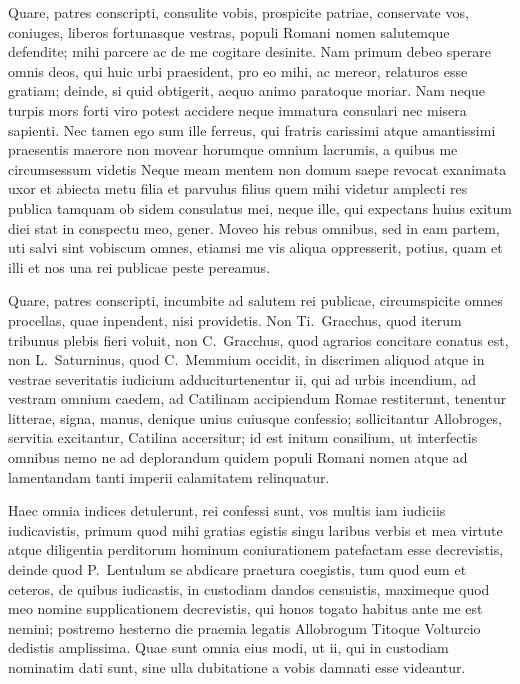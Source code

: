 \documentclass{elsart}
\begin{document}
Quare, patres conscripti, consulite vobis, prospicite patriae,
conservate vos, coniuges, liberos fortunasque vestras, populi Romani
nomen salutemque defendite; mihi parcere ac de me cogitare desinite. Nam
primum debeo sperare omnis deos, qui huic urbi praesident, pro eo mihi,
ac mereor, relaturos esse gratiam; deinde, si quid obtigerit, aequo
animo paratoque moriar. Nam neque turpis mors forti viro potest accidere
neque immatura consulari nec misera sapienti. Nec tamen ego sum ille
ferreus, qui fratris carissimi atque amantissimi praesentis maerore non
movear horumque omnium lacrumis, a quibus me circumsessum videtis Neque
meam mentem non domum saepe revocat exanimata uxor et abiecta metu filia
et parvulus filius quem mihi videtur amplecti res publica tamquam ob
sidem consulatus mei, neque ille, qui expectans huius exitum diei stat
in conspectu meo, gener. Moveo his rebus omnibus, sed in eam partem, uti
salvi sint vobiscum omnes, etiamsi me vis aliqua oppresserit, potius,
quam et illi et nos una rei publicae peste pereamus. \par Quare, patres
conscripti, incumbite ad salutem rei publicae, circumspicite omnes
procellas, quae inpendent, nisi providetis. Non Ti.~Gracchus, quod
iterum tribunus plebis fieri voluit, non C.~Gracchus, quod agrarios
concitare conatus est, non L.~Saturninus, quod C.~Memmium occidit, in
discrimen aliquod atque in vestrae severitatis iudicium
adduciturtenentur ii, qui ad urbis incendium, ad vestram omnium caedem,
ad Catilinam accipiendum Romae restiterunt, tenentur litterae, signa,
manus, denique unius cuiusque confessio; sollicitantur Allobroges,
servitia excitantur, Catilina accersitur; id est initum consilium, ut
interfectis omnibus nemo ne ad deplorandum quidem populi Romani nomen
atque ad lamentandam tanti imperii calamitatem relinquatur. \par Haec omnia
indices detulerunt, rei confessi sunt, vos multis iam iudiciis
iudicavistis, primum quod mihi gratias egistis singu laribus verbis et
mea virtute atque diligentia perditorum hominum coniurationem patefactam
esse decrevistis, deinde quod P.~Lentulum se abdicare praetura
coegistis, tum quod eum et ceteros, de quibus iudicastis, in custodiam
dandos censuistis, maximeque quod meo nomine supplicationem decrevistis,
qui honos togato habitus ante me est nemini; postremo hesterno die
praemia legatis Allobrogum Titoque Volturcio dedistis amplissima. Quae
sunt omnia eius modi, ut ii, qui in custodiam nominatim dati sunt, sine
ulla dubitatione a vobis damnati esse videantur.
\end{document}
